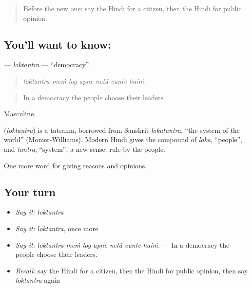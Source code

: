 \label{lesson:HI-C354-loktantra}



\begin{quote}
Before the new one: say the Hindi for a citizen, then the Hindi for public opinion.
\end{quote}

\subsection*{You'll want to know: }
\textbf{} — \emph{loktantra} — \textquotedblleft{}democracy\textquotedblright{}.

\begin{quote}
      
\end{quote}

\begin{quote}
\emph{loktantra meṁ log apne netā cunte haiṁ.}
\end{quote}

\begin{quote}
In a democracy the people choose their leaders.
\end{quote}

Masculine.

\begin{cousinweb}
\textbf{} (\emph{loktantra}) is a tatsama, borrowed from Sanskrit \emph{lokatantra}, \textquotedblleft{}the system of the world\textquotedblright{} (Monier-Williams). Modern Hindi gives the compound of \emph{loka}, \textquotedblleft{}people\textquotedblright{}, and \emph{tantra}, \textquotedblleft{}system\textquotedblright{}, a new sense: rule by the people.
\end{cousinweb}

\begin{grammarlens}[title={What you've built}]
One more word for giving reasons and opinions.
\end{grammarlens}

\subsection*{Your turn}
\begin{itemize}
\raggedright
  \item \emph{Say it:} \emph{loktantra}
  \item \emph{Say it:} \emph{loktantra}, once more
  \item \emph{Say it:} \emph{loktantra meṁ log apne netā cunte haiṁ.} — In a democracy the people choose their leaders.
  \item \emph{Recall:} say the Hindi for a citizen, then the Hindi for public opinion, then say \emph{loktantra} again
\end{itemize}

